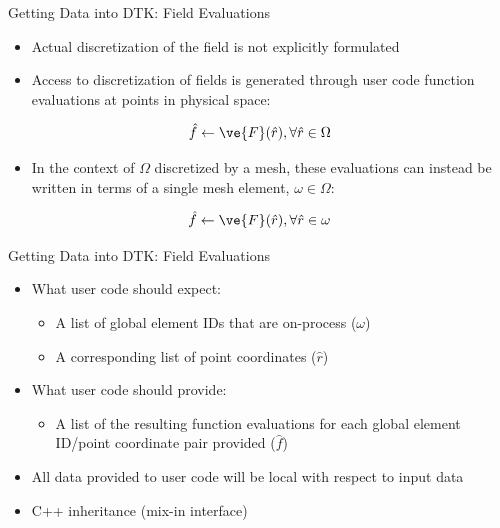 \documentclass{beamer}
\begin{document}
\begin{frame}{Getting Data into DTK: Field Evaluations}

  \begin{itemize}
  \item Actual discretization of the field is not explicitly
    formulated
    \medskip
  \item Access to discretization of fields is generated through user
    code function evaluations at points in physical space:
    \medskip
  \end{itemize}

  \[
  \hat{f} \leftarrow \ve{F}(\hat{r}), \forall \hat{r} \in \Omega
  \]

  \begin{itemize}
  \item In the context of $\Omega$ discretized by a mesh, these
    evaluations can instead be written in terms of a single mesh
    element, $\omega \in \Omega$:
  \end{itemize}

  \[
  \hat{f} \leftarrow \ve{F}(\hat{r}), \forall \hat{r} \in \omega
  \]

\end{frame}

\begin{frame}{Getting Data into DTK: Field Evaluations}

  \begin{itemize}
    \item What user code should expect:
      \medskip
      \begin{itemize}
      \item A list of global element IDs that are on-process ($\omega$)
      \item A corresponding list of point coordinates ($\hat{r}$)
      \end{itemize}
      \medskip
    \item What user code should provide:
      \medskip
      \begin{itemize}
      \item A list of the resulting function evaluations for each
        global element ID/point coordinate pair provided ($\hat{f}$)
      \end{itemize}
    \item All data provided to user code will be local with respect to
      input data
    \item C++ inheritance (mix-in interface)
  \end{itemize}

\end{frame}
\end{document}
